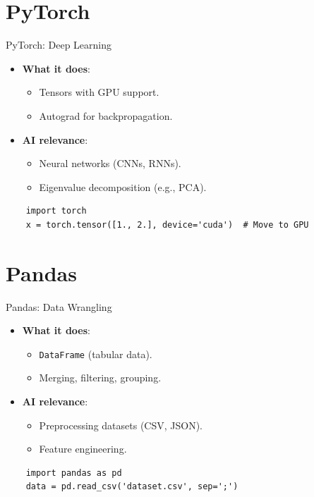 \documentclass{beamer}
\begin{document}
\section{PyTorch}

\begin{frame}{PyTorch: Deep Learning}
  \begin{itemize}
    \item \textbf{What it does}:
      \begin{itemize}
        \item Tensors with GPU support.
        \item Autograd for backpropagation.
      \end{itemize}
    \item \textbf{AI relevance}:
      \begin{itemize}
        \item Neural networks (CNNs, RNNs).
        \item Eigenvalue decomposition (e.g., PCA).
      \end{itemize}
  \end{itemize}
  \begin{example}
    \begin{lstlisting}
    import torch
    x = torch.tensor([1., 2.], device='cuda')  # Move to GPU
    \end{lstlisting}
  \end{example}
\end{frame}

\section{Pandas}

\begin{frame}{Pandas: Data Wrangling}
  \begin{itemize}
    \item \textbf{What it does}:
      \begin{itemize}
        \item \texttt{DataFrame} (tabular data).
        \item Merging, filtering, grouping.
      \end{itemize}
    \item \textbf{AI relevance}:
      \begin{itemize}
        \item Preprocessing datasets (CSV, JSON).
        \item Feature engineering.
      \end{itemize}
  \end{itemize}
  \begin{example}
    \begin{lstlisting}
    import pandas as pd
    data = pd.read_csv('dataset.csv', sep=';')
    \end{lstlisting}
  \end{example}
\end{frame}
\end{document}
